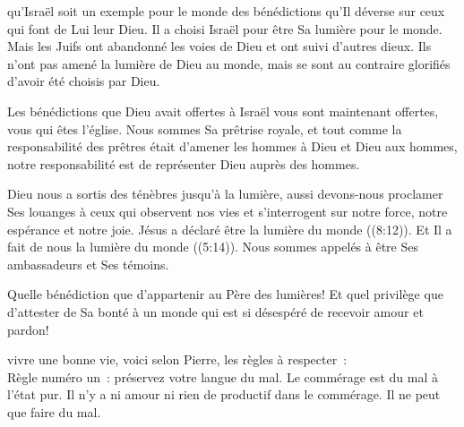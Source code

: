 
 qu'Israël soit un exemple pour le monde
 des bénédictions qu'Il déverse sur ceux qui font de Lui leur Dieu.
 Il a choisi Israël pour être Sa lumière pour le monde.
 Mais les Juifs ont abandonné les voies de Dieu et ont suivi d'autres dieux.
 Ils n'ont pas amené la lumière de Dieu au monde, mais se sont au contraire
 glorifiés d'avoir été choisis par Dieu.

Les bénédictions que Dieu avait offertes à Israël vous sont maintenant offertes,
 vous qui êtes l'église. 
 Nous sommes Sa prêtrise royale, et tout comme la responsabilité des prêtres
 était d'amener les hommes à Dieu et Dieu aux hommes,
 notre responsabilité est de représenter Dieu auprès des hommes.


Dieu nous a sortis des ténèbres jusqu'à la lumière, aussi devons-nous proclamer
 Ses louanges à ceux qui observent nos vies et s'interrogent sur notre force,
 notre espérance et notre joie. Jésus a déclaré être
 \og la lumière du monde \fg{} ((8:12)).
 Et Il a fait de nous \og la lumière du monde \fg{} ((5:14)).
 Nous sommes appelés à être Ses ambassadeurs et Ses témoins.

Quelle bénédiction que d'appartenir au Père des lumières!
 Et quel privilège que d'attester de Sa bonté à un monde qui est si désespéré
 de recevoir amour et pardon! 

\dvrule






 vivre une bonne vie,
 voici selon Pierre, les règles à respecter~: \\[1ex]
Règle numéro un~: préservez votre langue du mal.
 Le commérage est du mal à l'état pur. Il n'y a ni amour ni rien de productif
 dans le commérage. Il ne peut que faire du mal.

